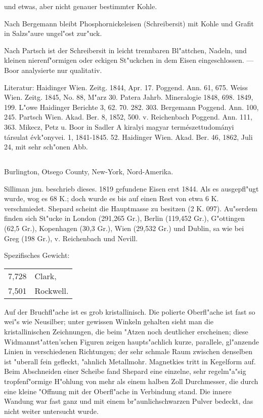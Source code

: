 \documentclass[a4paper, 11pt, oneside]{article}
\begin{document}
und etwas, aber nicht genauer bestimmter Kohle.

Nach Bergemann bleibt Phosphornickeleisen (Schreibersit) mit Kohle und Grafit in Salzs"aure ungel"ost zur"uck.

Nach Partsch ist der Schreibersit in leicht trennbaren Bl"attchen, Nadeln, und kleinen nierenf"ormigen oder eckigen St"uckchen in dem Eisen eingeschlossen. --- Boor analysierte nur qualitativ.

\normalsize
Literatur: Haidinger Wien. Zeitg. 1844, Apr. 17. Poggend. Ann. 61, 675. Weiss Wien. Zeitg. 1845, No. 88, M"arz 30. Patera Jahrb. Mineralogie 1848, 698. 1849, 199. L"owe Haidinger Berichte 3, 62. 70. 282. 303. Bergemann Poggend. Ann. 100, 245. Partsch Wien. Akad. Ber. 8, 1852, 500. v. Reichenbach Poggend. Ann. 111, 363. Mikecz, Petz u. Boor in Sadler A kiralyi magyar természettudományi társulat évk"onyvei. 1, 1841-1845. 52. Haidinger Wien. Akad. Ber. 46, 1862, Juli 24, mit sehr sch"onen Abb.

\subsection{}
\LARGE
\paragraph{}
Burlington, Otsego County, New-York, Nord-Amerika.

Silliman jun. beschrieb dieses. 1819 gefundene Eisen erst 1844. Als es ausgepfl"ugt wurde, wog es 68 K.; doch wurde es bis auf einen Rest von etwa 6 K. verschmiedet. Shepard scheint die Hauptmasse zu besitzen (2 K. 097). Au"serdem finden sich St"ucke in London (291,265 Gr.), Berlin (119,452 Gr.), G"ottingen (62,5 Gr.), Kopenhagen (30,3 Gr.), Wien (29,532 Gr.) und Dublin, sa wie bei Greg (198 Gr.), v. Reichenbach und Nevill.

Spezifisches Gewicht:  
\begin{table}[!ht]
    \centering\swabfamily\Large
    \begin{tabular}{l l}
        7,728 & Clark,\\
        7,501 & Rockwell.
    \end{tabular}
\end{table}

Auf der Bruchfl"ache ist es grob kristallinisch. Die polierte Oberfl"ache ist fast so wei"s wie Neusilber; unter gewissen Winkeln gehalten sieht man die kristallinischen Zeichnungen, die beim "Atzen noch deutlicher erscheinen; diese Widmannst"atten'schen Figuren zeigen haupts"achlich kurze, parallele, gl"anzende Linien in verschiedenen Richtungen; der sehr schmale Raum zwischen denselben ist "uberall fein gefleckt, "ahnlich Metallmohr. Magnetkies tritt in Kegelform auf. Beim Abschneiden einer Scheibe fand Shepard eine einzelne, sehr regelm"a"sig tropfenf"ormige H"ohlung von mehr als einem halben Zoll Durchmesser, die durch eine kleine "Offnung mit der Oberfl"ache in Verbindung stand. Die innere Wandung war fast ganz und mit einem br"aunlichschwarzen Pulver bedeckt, das nicht weiter untersucht wurde.
\end{document}
